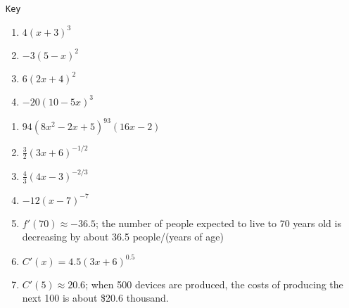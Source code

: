 \documentclass{article}
\newcounter{key}
\begin{document}
\vfill

\dotfill \newline

\texttt{Key}
\begin{multicols}{4}
\begin{enumerate}
    \item $4(x+3)^3$
    \item $-3(5-x)^2$
    \item $6(2x+4)^2$
    \item $-20(10-5x)^3$
\end{enumerate} \setcounter{key}{\value{enumi}}
\end{multicols}
\begin{enumerate}   \setcounter{enumi}{\value{key}}
    \item $94(8x^2-2x+5)^{93}(16x-2)$
    \item $\frac{3}{2}\left(3x+6\right)^{-1/2}$
    \item $\frac{4}{3}\left(4x-3\right)^{-2/3}$
    \item $-12(x-7)^{-7}$
    \item $f'(70) \approx -36.5$; the number of people expected to live to 70 years old is decreasing by about 36.5 people/(years of age)
    \item $C'(x) = 4.5(3x+6)^{0.5}$
    \item $C'(5) \approx 20.6$; when 500 devices are produced, the costs of producing the next 100 is about \$20.6 thousand.
\end{enumerate} \setcounter{key}{\value{enumi}}
\end{document}
